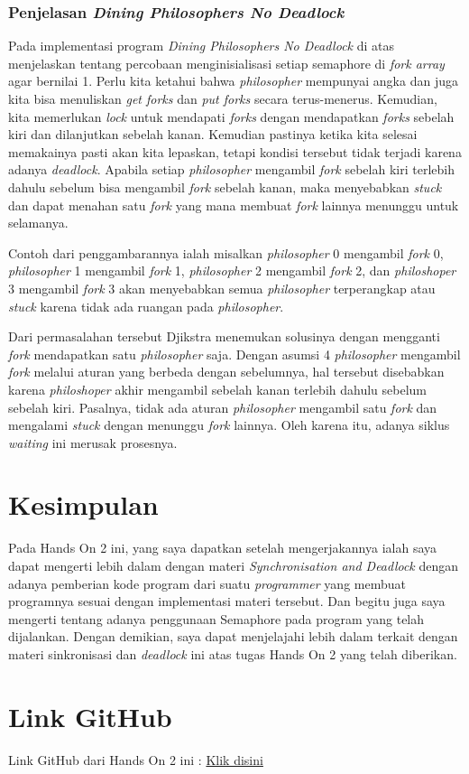 \documentclass[11pt,a4paper]{article}
\begin{document}
\subsubsection{Penjelasan \textit{Dining Philosophers No Deadlock}}
Pada implementasi program \textit{Dining Philosophers No Deadlock} di atas menjelaskan tentang percobaan menginisialisasi setiap semaphore di \textit{fork array} agar bernilai 1.
Perlu kita ketahui bahwa \textit{philosopher} mempunyai angka dan juga kita bisa menuliskan \textit{get forks} dan \textit{put forks} secara terus-menerus. Kemudian, kita memerlukan 
\textit{lock} untuk mendapati \textit{forks} dengan mendapatkan \textit{forks} sebelah kiri dan dilanjutkan sebelah kanan. Kemudian pastinya ketika kita selesai memakainya pasti akan kita 
lepaskan, tetapi kondisi tersebut tidak terjadi karena adanya \textit{deadlock}. Apabila setiap \textit{philosopher} mengambil \textit{fork} sebelah kiri terlebih dahulu sebelum bisa mengambil 
\textit{fork} sebelah kanan, maka menyebabkan \textit{stuck} dan dapat menahan satu \textit{fork} yang mana membuat \textit{fork} lainnya menunggu untuk selamanya. \par
Contoh dari penggambarannya ialah misalkan \textit{philosopher} 0 mengambil \textit{fork} 0, \textit{philosopher} 1 mengambil \textit{fork} 1, \textit{philosopher} 2 mengambil \textit{fork} 2, dan 
\textit{philoshoper} 3 mengambil \textit{fork} 3 akan menyebabkan semua \textit{philosopher} terperangkap atau \textit{stuck} karena tidak ada ruangan pada \textit{philosopher}. \par
Dari permasalahan tersebut Djikstra menemukan solusinya dengan mengganti \textit{fork} mendapatkan satu \textit{philosopher} saja. Dengan asumsi 4 \textit{philosopher} mengambil \textit{fork} melalui 
aturan yang berbeda dengan sebelumnya, hal tersebut disebabkan karena \textit{philoshoper} akhir mengambil sebelah kanan terlebih dahulu sebelum sebelah kiri. Pasalnya, tidak ada aturan \textit{philosopher} 
mengambil satu \textit{fork} dan mengalami \textit{stuck} dengan menunggu \textit{fork} lainnya. Oleh karena itu, adanya siklus \textit{waiting} ini merusak prosesnya.

\newpage
\section{Kesimpulan}
	Pada Hands On 2 ini, yang saya dapatkan setelah mengerjakannya ialah saya dapat mengerti lebih dalam dengan materi 
	\textit{Synchronisation and Deadlock} dengan adanya pemberian kode program dari suatu \textit{programmer} yang membuat 
	programnya sesuai dengan implementasi materi tersebut. Dan begitu juga saya mengerti tentang adanya penggunaan Semaphore 
	pada program yang telah dijalankan. Dengan demikian, saya dapat menjelajahi lebih dalam terkait dengan materi sinkronisasi 
	dan \textit{deadlock} ini atas tugas Hands On 2 yang telah diberikan.
		
\section{Link GitHub}
	Link GitHub dari Hands On 2 ini : \href{https://github.com/BilhaqAD07/Sistem-Operasi.git}{Klik disini}


\newpage


\end{document}
